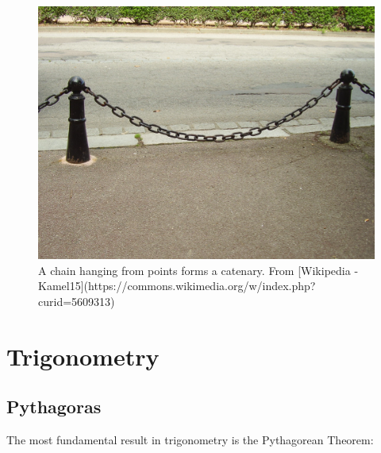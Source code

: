 \documentclass[
]{book}
\theoremstyle{definition}
\theoremstyle{definition}
\theoremstyle{definition}
\theoremstyle{definition}
\theoremstyle{remark}
\begin{document}
\begin{figure}
\includegraphics{figures/Kette_Kettenkurve_Catenary_2008_PD} \caption{A chain hanging from points forms a catenary. From [Wikipedia - Kamel15](https://commons.wikimedia.org/w/index.php?curid=5609313)}\label{fig:catenary}
\end{figure}

\hypertarget{trigonometry}{%
\chapter{Trigonometry}\label{trigonometry}}

\hypertarget{pythagoras}{%
\section{Pythagoras}\label{pythagoras}}

The most fundamental result in trigonometry is the Pythagorean Theorem:
\end{document}
